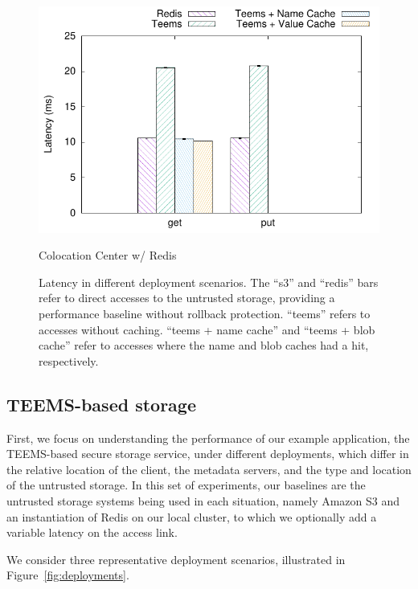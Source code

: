 \begin{figure}[t]
\begin{minipage}[t]{0.50\linewidth}
        \includegraphics[width=\linewidth]{teem_results/deployment/result/collocation_center}
        \caption{Colocation Center w/ Redis}\label{fig:coloc_redis}
    \end{minipage}
    \caption{Latency in different deployment scenarios. The
    ``s3'' and ``redis'' bars refer to direct accesses to the
    untrusted storage, providing a performance baseline without
    rollback protection. ``teems'' refers to accesses without
    caching. ``teems + name cache'' and ``teems +
    blob cache'' refer to accesses where the name and blob
    caches had a hit, respectively.}
\end{figure}



\subsection{\ac{TEEMS}-based storage}\label{ssec:eval_deploy}
First, we focus on understanding the performance of our example
application, the  \ac{TEEMS}-based secure storage service, under
different deployments, which differ in the relative location of
the client, the metadata servers, and the type and location of
the untrusted storage. In this set of experiments, our baselines
are the untrusted
storage systems being used in each situation, namely Amazon S3 and an
instantiation of Redis on our local cluster, to which we optionally
add a variable  latency on the
access link.

We consider three representative deployment scenarios, illustrated in
Figure~\ref{fig:deployments}.


